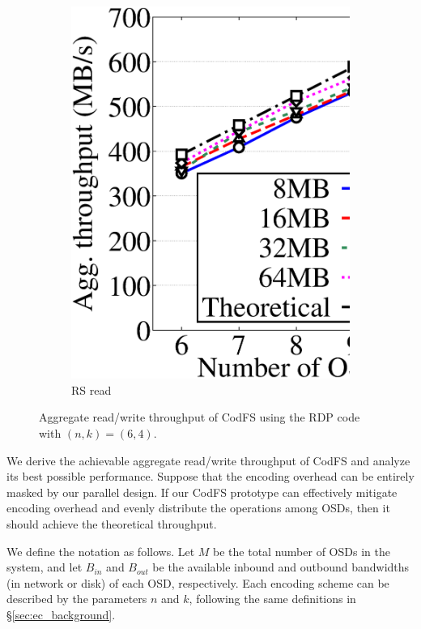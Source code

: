 \begin{figure}[!t]
\begin{subfigure}{0.4\linewidth}
     \includegraphics[width=\linewidth]{charts/transfer/eps/down/rs_6}
     \caption{RS read}
     \label{fig:rs_read}
 \end{subfigure}
 \caption{Aggregate read/write throughput of CodFS using the RDP code with
	 $(n,k)=(6,4)$.}
 \label{fig:data}
\end{figure}


We derive the achievable aggregate read/write throughput of CodFS and analyze
its best possible performance.  Suppose that the encoding overhead can be
entirely masked by our parallel design.  If our CodFS prototype can
effectively mitigate encoding overhead and evenly distribute the operations
among OSDs, then it should achieve the theoretical throughput. 

We define the notation as follows.  Let $M$ be the total number of OSDs in the
system, and let $B_{in}$ and $B_{out}$ be the available inbound and outbound
bandwidths (in network or disk) of each OSD, respectively.  Each encoding scheme
can be described by the parameters $n$ and $k$, following the same definitions
in \S\ref{sec:ec_background}.  

